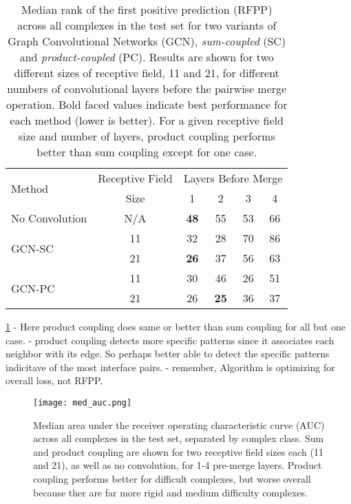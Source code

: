 \begin{table}
	\begin{center}
		\begin{tabular}{lccccc}
			\toprule
			\multirow{2}{*}{Method} &
			Receptive Field & \multicolumn{4}{c}{Layers Before Merge} \\
			& Size & 1 & {2} & {3} & {4} \\
			\midrule
			No Convolution & N/A & \textbf{48} & 55 & 53 & 66 \\\cline{1-6}
			\multirow{2}{*}{GCN-SC} & 11 & 32 & 28 & 70 & 86 \\
			& 21 & \textbf{26} & 37 & 56 & 63 \\\cline{1-6}
			\multirow{2}{*}{GCN-PC} & 11 & 30 & 46 & 26 & 51 \\
			& 21 & 26 & \textbf{25} & 36 & 37 \\
			\bottomrule
		\end{tabular}
		\caption{Median rank of the first positive prediction (RFPP) across all complexes in the test set for two variants of Graph Convolutional Networks (GCN), \textit{sum-coupled} (SC) and \textit{product-coupled} (PC). Results are shown for two different sizes of receptive field, 11 and 21, for different numbers of convolutional layers before the pairwise merge operation. Bold faced values indicate best performance for each method (lower is better). For a given receptive field size and number of layers, product coupling performs better than sum coupling except for one case.}
		\label{tab:med_rfpp}
	\end{center}
\end{table}

\ref{tab:med_rfpp}
	- Here product coupling does same or better than sum coupling for all but one case.
	- product coupling detects more specific patterns since it associates each neighbor with its edge. So perhaps better able to detect the specific patterns indicitave of the most interface pairs.
	- remember, Algorithm is optimizing for overall loss, not RFPP.
	
\begin{figure}
	\texttt{[image: med\_auc.png]}
	\caption{Median area under the receiver operating characteristic curve (AUC) across all complexes in the test set, separated by complex class. Sum and product coupling are shown for two receptive field sizes each (11 and 21), as well as no convolution, for 1-4 pre-merge layers. Product coupling performs better for difficult complexes, but worse overall because ther are far more rigid and medium difficulty complexes.
		\label{fig:med_auc}}
\end{figure}
	

